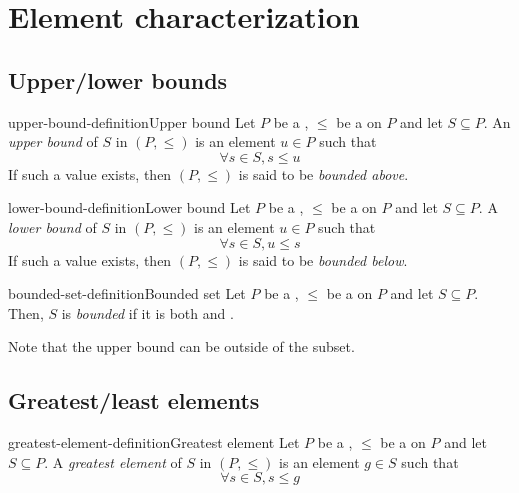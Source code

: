 \documentclass[preview]{standalone}
\begin{document}
\section{Element characterization}

\subsection{Upper/lower bounds}

\begin{snippetdefinition}{upper-bound-definition}{Upper bound}
    Let \(P\) be a \set, \(\leq\) be a \preorder on \(P\) and let \(S\subseteq P\).
    An \textit{upper bound} of \(S\) in \((P, \leq)\) is an element \(u\in P\) such that
    \[ \forall s\in S, s \leq u \]
    If such a value exists, then \((P, \leq)\) is said to be \textit{bounded above}.
\end{snippetdefinition}

\begin{snippetdefinition}{lower-bound-definition}{Lower bound}
    Let \(P\) be a \set, \(\leq\) be a \preorder on \(P\) and let \(S\subseteq P\).
    A \textit{lower bound} of \(S\) in \((P, \leq)\) is an element \(u\in P\) such that
    \[ \forall s\in S, u \leq s \]
    If such a value exists, then \((P, \leq)\) is said to be \textit{bounded below}.
\end{snippetdefinition}

\begin{snippetdefinition}{bounded-set-definition}{Bounded set}
    Let \(P\) be a \set, \(\leq\) be a \preorder on \(P\) and let \(S\subseteq P\).
    Then, \(S\) is \textit{bounded} if it is both  and
    .
\end{snippetdefinition}

\begin{plainhtml}
    Note that the upper bound can be outside of the subset.
\end{plainhtml}

\subsection{Greatest/least elements}

\begin{snippetdefinition}{greatest-element-definition}{Greatest element}
    Let \(P\) be a \set, \(\leq\) be a \preorder on \(P\) and let \(S\subseteq P\).
    A \textit{greatest element} of \(S\) in \((P, \leq)\) is an element \(g \in S\) such that
    \[ \forall s\in S, s \leq g \]
\end{snippetdefinition}
\end{document}
